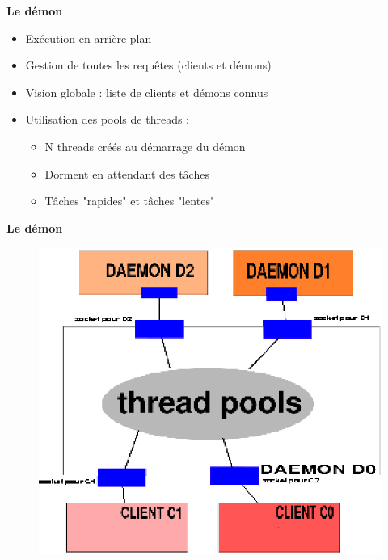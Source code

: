 \documentclass{beamer}
\begin{document}
\begin{frame}
    \textbf{Le démon}
    \begin{itemize}
        \item Exécution en arrière-plan
        \item Gestion de toutes les requêtes (clients et démons)
        \item Vision globale : liste de clients et démons connus
        \item Utilisation des pools de threads :
            \begin{itemize}
                \item N threads créés au démarrage du démon
                \item Dorment en attendant des tâches
                \item Tâches "rapides" et tâches "lentes"
            \end{itemize}
     \end{itemize}
\end{frame}

\begin{frame}
    \textbf{Le démon}
\begin{center}
\begin{figure}[htbp]
    \centering
    \includegraphics[scale=0.8]{archi_daemon.eps}
\end{figure}
\end{center}
\end{frame}
\end{document}
